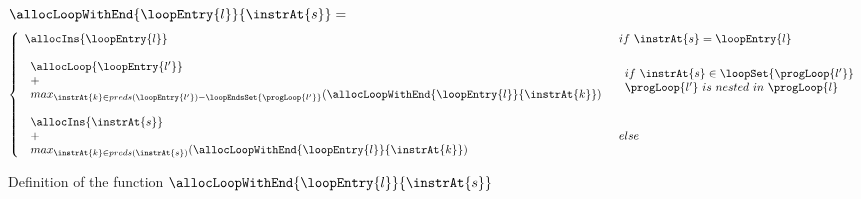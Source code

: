 \begin{figure}[!hbp]

$\allocLoopWithEnd{\loopEntry{l}}{\instrAt{s}} = $
$$ 
\left\{\begin{array}{ll}

 \allocIns{\loopEntry{l}}  & if \  \instrAt{s} = \loopEntry{l} \\
  & \\
 \begin{array}{l}
           \allocLoop{\loopEntry{l'}} \\
          + \\
      max_{\instrAt{k} \in preds(\loopEntry{l'} ) - \loopEndsSet{\progLoop{l'}}}
       ( \allocLoopWithEnd{\loopEntry{l}}{\instrAt{k}} )
    \end{array} &  \begin{array}{l}
                                        if \  \instrAt{s} \in  \loopSet{\progLoop{l'}} \\
                                          \progLoop{l'} \ is \  nested \ in \ \progLoop{l}
                                    \end{array} \\
  & \\
  \begin{array}{l}
     \allocIns{\instrAt{s}} \\
     + \\
     max_{\instrAt{k} \in preds(\instrAt{s} )}
     ( \allocLoopWithEnd{\loopEntry{l}}{\instrAt{k}} )
                       \end{array} & else \\

\end{array} \right.
$$
 \caption{\sc Definition of the function $\allocLoopWithEnd{\loopEntry{l}}{\instrAt{s}}$}
\label{fig:loopPath}
\end{figure}


